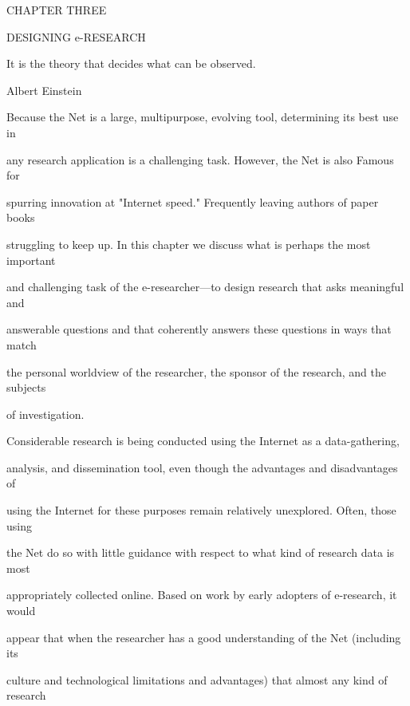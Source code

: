\documentclass{book}
\begin{document}
\noindent \begin{flushleft}
CHAPTER THREE                                                                                                                                       

\noindent 

\noindent DESIGNING e-RESEARCH

\noindent 

\noindent It is the theory that decides what can be observed.

\noindent Albert Einstein 

\noindent 

\noindent Because the Net is a large, multipurpose, evolving tool, determining its best use in

\noindent any research application is a challenging task. However, the Net is also Famous for

\noindent spurring innovation at "Internet speed." Frequently leaving authors of paper books

\noindent struggling to keep up. In this chapter we discuss what is perhaps the most important

\noindent and challenging task of the e-researcher---to design research that asks meaningful and

\noindent answerable questions and that coherently answers these questions in ways that match

\noindent the personal worldview of the researcher, the sponsor of the research, and the subjects

\noindent of investigation.

\noindent 

\noindent Considerable research is being conducted using the Internet as a data-gathering,

\noindent analysis, and dissemination tool, even though the advantages and disadvantages of

\noindent using the Internet for these purposes remain relatively unexplored. Often, those using

\noindent the Net do so with little guidance with respect to what kind of research data is most

\noindent appropriately collected online. Based on work  by early adopters of e-research, it would

\noindent appear that when the researcher has a good understanding of the Net (including its

\noindent culture and technological limitations and advantages) that almost any kind of research


\end{flushleft}
\end{document}
